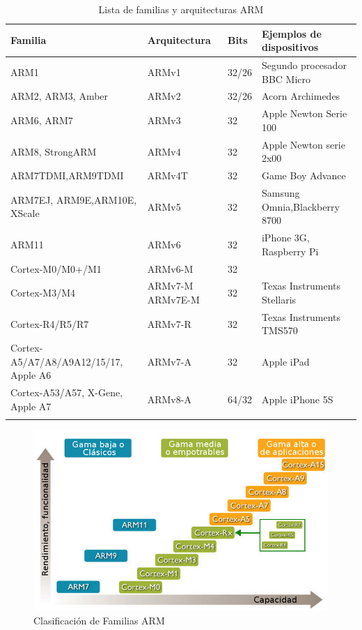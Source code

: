 \begin{longtable}{| p{4.2cm} | p{2.5cm} | p{1cm} | p{6cm} |}
\hline
{\bf Familia} & {\bf Arquitectura} & {\bf Bits} & {\bf Ejemplos de dispositivos} \\ \hline
ARM1      & ARMv1       & 32/26 & Segundo procesador BBC Micro \\ \hline
ARM2, ARM3, Amber & ARMv2      & 32/26 & Acorn Archimedes \\ \hline
ARM6, ARM7 & ARMv3      & 32 & Apple Newton Serie 100 \\ \hline
ARM8, StrongARM & ARMv4       & 32 & Apple Newton serie 2x00 \\ \hline
ARM7TDMI,\newline ARM9TDMI & ARMv4T & 32 & Game Boy Advance \\ \hline
ARM7EJ, ARM9E,\newline ARM10E, XScale & ARMv5 & 32 & Samsung Omnia,\newline Blackberry 8700 \\ \hline
ARM11     & ARMv6 & 32 & iPhone 3G, Raspberry Pi \\ \hline
Cortex-M0/M0+/M1 & ARMv6-M & 32 & \\ \hline
Cortex-M3/M4 & ARMv7-M ARMv7E-M & 32 & Texas Instruments Stellaris \\ \hline
Cortex-R4/R5/R7 & ARMv7-R & 32 & Texas Instruments TMS570 \\ \hline
Cortex-A5/A7/A8/A9\newline A12/15/17, Apple A6 & ARMv7-A & 32 & Apple iPad \\ \hline
Cortex-A53/A57, X-Gene, Apple A7 & ARMv8-A & 64/32 & Apple iPhone 5S\\ \hline
\caption{Lista de familias y arquitecturas ARM}
\label{list_fam}
\endfoot
\end{longtable}

\begin{figure}[h]
  \centering
    \includegraphics[width=14cm]{graphs/ArmRoadMap.jpg}
  \caption{Clasificación de Familias ARM}
  \label{fig:clasif_fami}
\end{figure}

